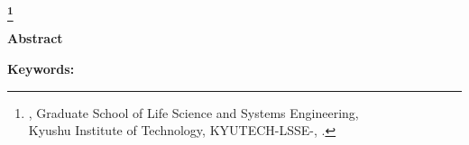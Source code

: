 \begin{center}
 \renewcommand{\thefootnote}{\fnsymbol{footnote}}
 \Large\bfseries \etitle\footnote[1]
 {{\edoctitle}, Graduate School of Life Science and Systems \mbox{Engineering,}\\
  Kyushu Institute of Technology,
  {KYUTECH-LSSE-\studentnumber}, \edate.}
 \renewcommand{\thefootnote}{\arabic{footnote}}
\end{center}

\vspace*{1truemm}
\begin{center}
 \large\eauthor
\end{center}

\vspace*{10truemm}
\begin{center}
 {\bfseries Abstract}
\end{center}

\vspace*{2truemm}
\par
\eabstract

\vspace*{5truemm}
\begin{flushleft}
 {\bfseries Keywords:}
\end{flushleft}
\ekeywords
